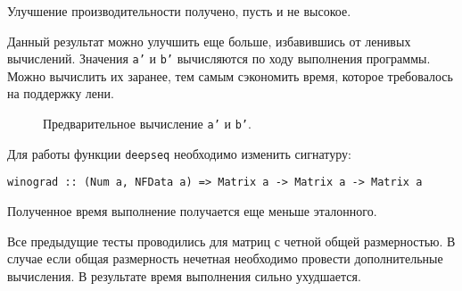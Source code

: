 \documentclass[a4paper,12pt,russian]{article}
\begin{document}
	Улучшение производительности получено, пусть и не высокое.
	
	
	Данный результат можно улучшить еще больше, избавившись от ленивых вычислений. Значения \texttt{a'} и \texttt{b'} вычисляются по ходу выполнения программы. Можно вычислить их заранее, тем самым сэкономить время, которое требовалось на поддержку лени. 
	
	\begin{figure}[H]
		\caption{Предварительное вычисление \texttt{a'} и \texttt{b'}.}
		
	\end{figure}
	
	Для работы функции \texttt{deepseq} необходимо изменить сигнатуру:
	
	\begin{lstlisting} 
winograd :: (Num a, NFData a) => Matrix a -> Matrix a -> Matrix a
	\end{lstlisting}
	
	Полученное время выполнение получается еще меньше эталонного.
	
	
	Все предыдущие тесты проводились для матриц с четной общей размерностью. В случае если общая размерность нечетная необходимо провести дополнительные вычисления. 
	В результате время выполнения сильно ухудшается.
	
	
\end{document}
